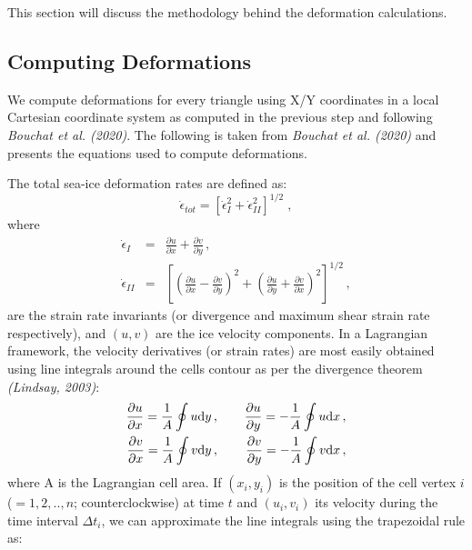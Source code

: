 \documentclass{article}
\begin{document}
    This section will discuss the methodology behind the deformation calculations.

    \subsection{Computing Deformations}

    We compute deformations for every triangle using X/Y coordinates in a local Cartesian coordinate system as computed in the previous step and following \textit{Bouchat et al. (2020)}. The following is taken from \textit{Bouchat et al. (2020)} and presents the equations used to compute deformations.

    The total sea-ice deformation rates are defined as:
    \begin{equation}
        \dot{\epsilon}_{tot} = \left[ \dot{\epsilon}^2_{I}+\dot{\epsilon}^2_{II} \right]^{1/2} \;,
    \end{equation}
    where
    \begin{eqnarray}
        \dot{\epsilon}_{I} &= &\frac{\partial u}{\partial x}+\frac{\partial v}{\partial y} \, , \label{eq:eps_I} \\
        \dot{\epsilon}_{II} &= &\left[ \left( \frac{\partial u}{\partial x} - \frac{\partial v}{\partial y}\right)^{2} + \left( \frac{\partial u}{\partial y} + \frac{\partial v}{\partial x}\right)^{2}   \right]^{1/2} \, , \label{eq:eps_II}
    \end{eqnarray}
    are the strain rate invariants (or divergence and maximum shear strain rate respectively), and $(u,v)$ are the ice velocity components. In a Lagrangian framework, the velocity derivatives (or strain rates) are most easily obtained using line integrals around the cells contour as per the divergence theorem \textit{(Lindsay, 2003)}:
    \begin{eqnarray}
        \frac{\partial u}{\partial x}  = \frac{1}{A}\oint u \textrm{d}y \, ,&  \hspace{0.4cm} & \frac{\partial u}{\partial y}  = -\frac{1}{A}\oint u \textrm{d}x \, , \nonumber \\
        \frac{\partial v}{\partial x}  = \frac{1}{A}\oint v \textrm{d}y \, ,&  \hspace{0.4cm}  & \frac{\partial v}{\partial y}  = -\frac{1}{A}\oint v \textrm{d}x\, ,
        \label{eq:dudx}
    \end{eqnarray}
    where A is the Lagrangian cell area. If $(x_{i}, y_{i})$ is the position of the cell vertex $i$ ($=1,2,..,n$; counterclockwise) at time $t$ and $(u_{i}, v_{i})$ its velocity during the time interval $\Delta t_{i}$, we can approximate the line integrals using the trapezoidal rule as:
\end{document}
